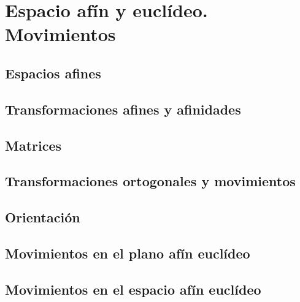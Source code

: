 




    
\chapter{Espacio afín y euclídeo. Movimientos}

\section{Espacios afines}
\section{Transformaciones afines y afinidades}
\section{Matrices}
\section{Transformaciones ortogonales y movimientos}
\section{Orientación}
\section{Movimientos en el plano afín euclídeo}
\section{Movimientos en el espacio afín euclídeo}